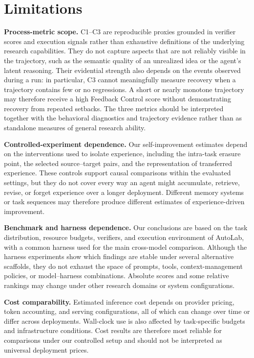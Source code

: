 \section*{Limitations}

\textbf{Process-metric scope.}
C1--C3 are reproducible proxies grounded in verifier scores and execution signals rather than exhaustive definitions of the underlying research capabilities.
They do not capture aspects that are not reliably visible in the trajectory, such as the semantic quality of an unrealized idea or the agent's latent reasoning.
Their evidential strength also depends on the events observed during a run: in particular, C3 cannot meaningfully measure recovery when a trajectory contains few or no regressions.
A short or nearly monotone trajectory may therefore receive a high Feedback Control score without demonstrating recovery from repeated setbacks.
The three metrics should be interpreted together with the behavioral diagnostics and trajectory evidence rather than as standalone measures of general research ability.

\textbf{Controlled-experiment dependence.}
Our self-improvement estimates depend on the interventions used to isolate experience, including the intra-task erasure point, the selected source--target pairs, and the representation of transferred experience.
These controls support causal comparisons within the evaluated settings, but they do not cover every way an agent might accumulate, retrieve, revise, or forget experience over a longer deployment.
Different memory systems or task sequences may therefore produce different estimates of experience-driven improvement.

\textbf{Benchmark and harness dependence.}
Our conclusions are based on the task distribution, resource budgets, verifiers, and execution environment of AutoLab, with a common harness used for the main cross-model comparison.
Although the harness experiments show which findings are stable under several alternative scaffolds, they do not exhaust the space of prompts, tools, context-management policies, or model--harness combinations.
Absolute scores and some relative rankings may change under other research domains or system configurations.

\textbf{Cost comparability.}
Estimated inference cost depends on provider pricing, token accounting, and serving configurations, all of which can change over time or differ across deployments.
Wall-clock use is also affected by task-specific budgets and infrastructure conditions.
Cost results are therefore most reliable for comparisons under our controlled setup and should not be interpreted as universal deployment prices.

